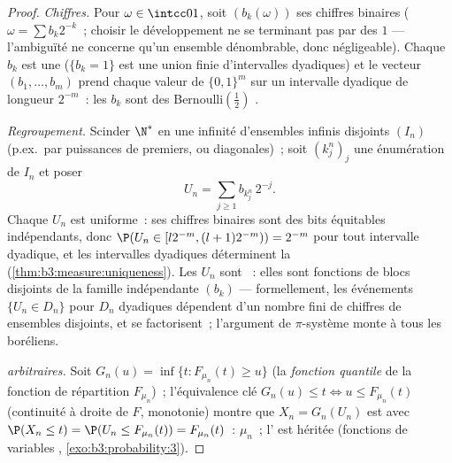 \begin{proof}
\emph{Chiffres.} Pour $\omega \in \intcc01$, soit
$(b_k(\omega))$ ses chiffres binaires ($\omega = \sum
b_k2^{-k}$~; choisir le développement ne se terminant pas
par des $1$ --- l'ambiguïté ne concerne qu'un ensemble
dénombrable, donc négligeable). Chaque $b_k$ est une
 ($\{b_k = 1\}$ est une union finie
d'intervalles dyadiques) et le vecteur $(b_1, \dots, b_m)$
prend chaque valeur de $\{0,1\}^m$ sur un intervalle
dyadique de longueur $2^{-m}$~: les $b_k$ sont des
Bernoulli$(\frac12)$ .

\emph{Regroupement.} Scinder $\N^*$ en une infinité
d'ensembles infinis disjoints $(I_n)$ (p.ex.\ par puissances
de premiers, ou diagonales)~; soit $(k^n_j)_j$ une
énumération de $I_n$ et poser
\[
U_n = \sum_{j\geq1} b_{k^n_j}\,2^{-j} .
\]
Chaque $U_n$ est uniforme~: ses chiffres binaires sont des
bits équitables indépendants, donc $\P(U_n \in [l2^{-m},
(l+1)2^{-m})) = 2^{-m}$ pour tout intervalle dyadique, et les
intervalles dyadiques déterminent la 
(\cref{thm:b3:measure:uniqueness}). Les $U_n$ sont
~: elles sont fonctions de blocs disjoints de
la famille indépendante $(b_k)$ --- formellement, les
événements $\{U_n \in D_n\}$ pour $D_n$ dyadiques dépendent
d'un nombre fini de chiffres de ensembles disjoints, et se
factorisent~; l'argument de $\pi$-système monte à tous les
boréliens.

\emph{ arbitraires.} Soit $G_n(u) = \inf\{t :
F_{\mu_n}(t) \geq u\}$ (la \emph{fonction quantile} de la
fonction de répartition $F_{\mu_n}$)~; l'équivalence clé
$G_n(u) \leq t \iff u \leq F_{\mu_n}(t)$ (continuité à
droite de $F$, monotonie) montre que $X_n = G_n(U_n)$ est
 avec $\P(X_n \leq t) = \P(U_n \leq F_{\mu_n}(t))
= F_{\mu_n}(t)$~:  $\mu_n$~; l' est héritée
(fonctions de variables ,
\cref{exo:b3:probability:3}).
\end{proof}

